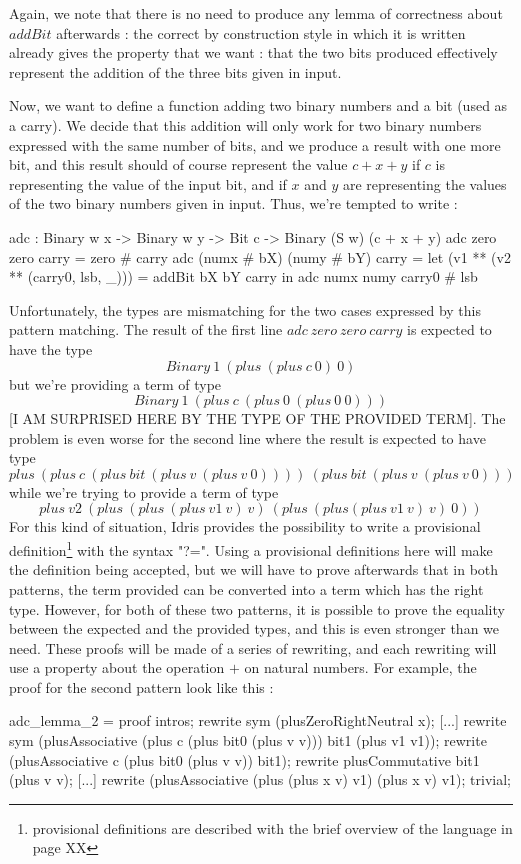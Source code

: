Again, we note that there is no need to produce any lemma of correctness about $addBit$ afterwards : the correct by construction style in which it is written already gives the property that we want : that the two bits produced effectively represent the addition of the three bits given in input.

Now, we want to define a function adding two binary numbers and a bit (used as a carry). We decide that this addition will only work for two binary numbers expressed with the same number of bits, and we produce a result with one more bit, and this result should of course represent the value $c + x + y$ if $c$ is representing the value of the input bit, and if $x$ and $y$ are representing the values of the two binary numbers given in input. Thus, we're tempted to write :
\begin{code}[caption=Addition of two binary numbers, captionpos=b, label=lst1:haskell2]
adc : Binary w x -> Binary w y -> Bit c 
     -> Binary (S w) (c + x + y)
adc zero zero carry = zero # carry
adc (numx # bX) (numy # bY) carry
   = let (v1 ** (v2 ** (carry0, lsb, _))) = 
      addBit bX bY carry in
          adc numx numy carry0 # lsb
\end{code}
Unfortunately, the types are mismatching for the two cases expressed by this pattern matching. The result of the first line $adc\ zero\ zero\ carry$ is expected to have the type\[Binary\ 1\ (plus\ (plus\ c\ 0)\ 0)\] but we're providing a term of type \[Binary\ 1\ (plus\ c\ (plus\ 0\ (plus\ 0\ 0)))\] [I AM SURPRISED HERE BY THE TYPE OF THE PROVIDED TERM].
The problem is even worse for the second line where the result is expected to have type \[plus\ (plus\ c\ (plus\ bit\ (plus\ v\ (plus\ v\ 0))))\ (plus\ bit\ (plus\ v\ (plus\ v\ 0)))\] while we're trying to provide a term of type \[plus\ v2\ (plus\ (plus\ (plus\ v1\ v)\ v)\ (plus\ (plus (plus\ v1\ v)\ v)\ 0))\]
For this kind of situation, Idris provides the possibility to write a provisional definition\footnote{provisional definitions are described with the brief overview of the language in page XX} with the syntax "?=". Using a provisional definitions here will make the definition being accepted, but we will have to prove afterwards that in both patterns, the term provided can be converted into a term which has the right type.
However, for both of these two patterns, it is possible to prove the equality between the expected and the provided types, and this is even stronger than we need. These proofs will be made of a series of rewriting, and each rewriting will use a property about the operation $+$ on natural numbers.
For example, the proof for the second pattern look like this :
\begin{code}[caption=Proof by hand of the correspondence between expected and provided types for the second pattern of the definition of adc, captionpos=b, label=lst1:haskell2]
adc_lemma_2 = proof {
    intros;
    rewrite sym (plusZeroRightNeutral x);
    [...]
    rewrite sym (plusAssociative (plus c (plus bit0 (plus v v))) bit1 (plus v1 v1));
    rewrite (plusAssociative c (plus bit0 (plus v v)) bit1);
    rewrite plusCommutative bit1 (plus v v);
    [...]
    rewrite (plusAssociative (plus (plus x v) v1) (plus x v) v1);
    trivial;
}
\end{code}

